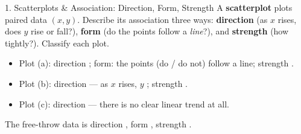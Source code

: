 \documentclass[10pt]{article}
\newcommand{\lgrid}[4]{%
  \draw[step=1, linegray!40, very thin] (#1,#3) grid (#2,#4);
  \draw[->, semithick, charcoal] (#1,0)--(#2,0) node[below right, font=\scriptsize]{$x$};
  \draw[->, semithick, charcoal] (0,#3)--(0,#4) node[left, font=\scriptsize]{$y$};}
\newcommand{\dpt}[2]{\fill[navy] (#1,#2) circle (2.6pt);}
\begin{document}
\boxguard[24]
\begin{notesbox}{1. Scatterplots \& Association: Direction, Form, Strength}
A \textbf{scatterplot} plots paired data $(x,y)$. Describe its association three ways:
\textbf{direction} (as $x$ rises, does $y$ rise or fall?), \textbf{form} (do the points follow a
\emph{line}?), and \textbf{strength} (how tightly?). Classify each plot.
\begin{center}
\hspace{0.4cm}
\hspace{0.4cm}
\end{center}
\begin{itemize}[leftmargin=1.5em, itemsep=2pt]
  \item Plot (a): direction ; form: the points  (do / do not) follow
        a line; strength .
  \item Plot (b): direction  --- as $x$ rises, $y$ ; strength
        .
  \item Plot (c): direction  --- there is no clear linear trend at all.
\end{itemize}
The free-throw data is direction , form , strength .
\end{notesbox}
\end{document}
